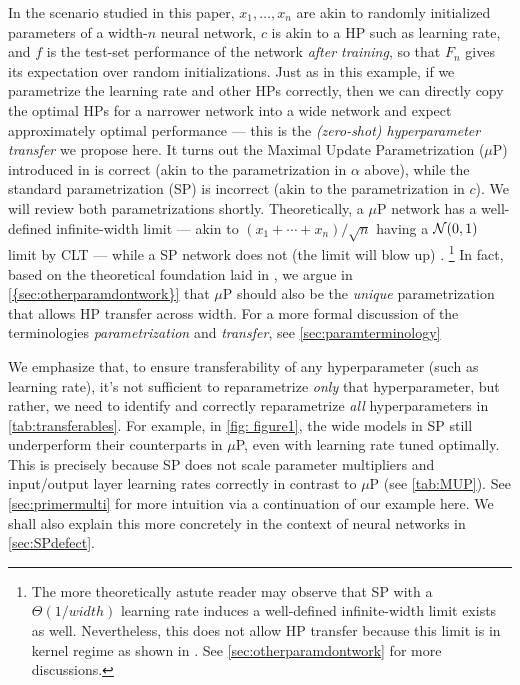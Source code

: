 \documentclass{article}
\theoremstyle{definition}
\begin{document}
In the scenario studied in this paper, $x_{1},\ldots,x_{n}$ are akin
to randomly initialized parameters of a width-$n$ neural network,
$c$ is akin to a HP such as learning rate, and $f$ is
the test-set performance of the network \emph{after training}, so
that $F_{n}$ gives its expectation over random initializations. Just
as in this example, if we parametrize the learning rate and other
HPs correctly, then we can directly copy the optimal HPs
for a narrower network into a wide network and expect approximately
optimal performance --- this is the \emph{(zero-shot) hyperparameter transfer}
we propose here. It turns out the Maximal Update Parametrization ($\mu$P)
introduced in \cite{TP4} is correct (akin to the parametrization
in $\alpha$ above), while the standard parametrization (SP) is incorrect
(akin to the parametrization in $c$).
We will review both parametrizations shortly.
Theoretically, a $\mu$P network has a well-defined infinite-width limit  --- akin to $(x_1 + \cdots + x_n)/\sqrt n$ having a $\mathcal{N}(0, 1)$ limit by CLT --- while a SP network does not (the limit will blow up) \citep{TP4}.
\footnote{The more theoretically astute reader may observe that SP with a $\Theta(1/width)$ learning rate induces a well-defined infinite-width limit exists as well.
Nevertheless, this does not allow HP transfer because this limit is in kernel regime as shown in \citep{TP4}.
See \cref{sec:otherparamdontwork} for more discussions.}
In fact, based on the theoretical foundation laid in \citep{TP4},  we argue in \cref{{sec:otherparamdontwork}} that $\mu$P should also be the \emph{unique} parametrization that allows HP transfer across width.
For a more formal discussion of the terminologies \emph{parametrization} and \emph{transfer}, see \cref{sec:paramterminology}

We emphasize that, to ensure transferability of any hyperparameter (such as learning rate), it's not sufficient to reparametrize \emph{only} that hyperparameter, but rather, we need to identify and correctly reparametrize \emph{all} hyperparameters in \cref{tab:transferables}.
For example, in \cref{fig: figure1}, the wide models in SP still underperform their counterparts in $\mu$P, even with learning rate tuned optimally.
This is precisely because SP does not scale parameter multipliers and input/output layer learning rates correctly in contrast to $\mu$P (see \cref{tab:MUP}).
See \cref{sec:primermulti} for more intuition via a continuation of our example here.
We shall also explain this more concretely in the context of neural networks in \cref{sec:SPdefect}.
\end{document}
